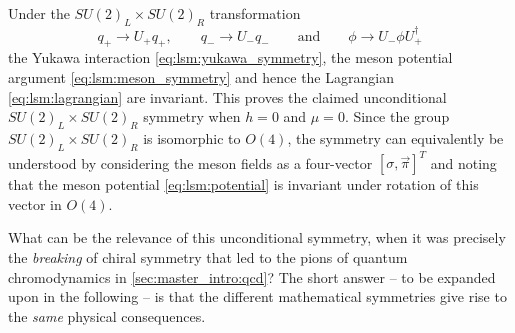 Under the $SU(2)_L \times SU(2)_R$ transformation 
\begin{equation}
	q_+ \rightarrow U_+ q_+, \qquad
	q_- \rightarrow U_- q_-
	\qquad \text{and} \qquad
	\phi   \rightarrow U_- \phi U_+^\dagger
\end{equation}
the Yukawa interaction \eqref{eq:lsm:yukawa_symmetry},
the meson potential argument \eqref{eq:lsm:meson_symmetry}
and hence the Lagrangian \eqref{eq:lsm:lagrangian} are invariant.
This proves the claimed unconditional $SU(2)_L \times SU(2)_R$ symmetry when $h=0$ and $\mu=0$.
Since the group $SU(2)_L \times SU(2)_R$ is isomorphic to $O(4)$,
the symmetry can equivalently be understood by considering the meson fields as a four-vector $[\sigma, \vec{\pi}]^T$
and noting that the meson potential \eqref{eq:lsm:potential} is invariant under rotation of this vector in $O(4)$.

What can be the relevance of this unconditional symmetry,
when it was precisely the \emph{breaking} of chiral symmetry that led to the pions of quantum chromodynamics in \cref{sec:master_intro:qcd}?
The short answer -- to be expanded upon in the following -- is that the different mathematical symmetries give rise to the \emph{same} physical consequences.

